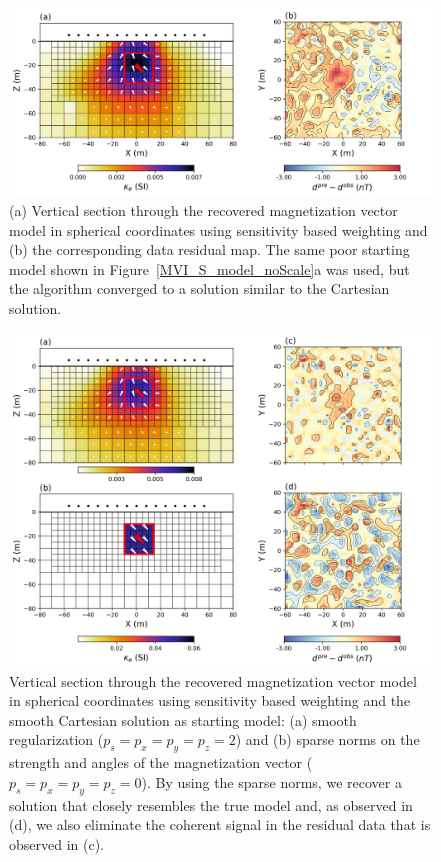 \documentclass[paper]{geophysics}
\begin{document}
\begin{figure}[p!]
\includegraphics[width=\columnwidth]{Figures/Figure6.png}
\caption{(a) Vertical section through the recovered magnetization vector model in spherical coordinates using sensitivity based weighting and (b) the corresponding data residual map. The same poor starting model shown in Figure~\ref{MVI_S_model_noScale}a was used, but the algorithm converged to a solution similar to the Cartesian solution.}
\label{MVI_S_model}
\end{figure}

\begin{figure}[p!]
\includegraphics[width=\columnwidth]{Figures/Figure7.png}
\caption{Vertical section through the recovered magnetization vector model in spherical coordinates using sensitivity based weighting and the smooth Cartesian solution as starting model: (a) smooth regularization ($p_s=p_x=p_y=p_z = 2$) and (b) sparse norms on the strength and angles of the magnetization vector ($p_s=p_x=p_y=p_z = 0$). By using the sparse norms, we recover a solution that closely resembles the true model and, as observed in (d), we also eliminate the coherent signal in the residual data that is observed in (c).}
\label{MVI_S_model_lp}
\end{figure}
\end{document}
